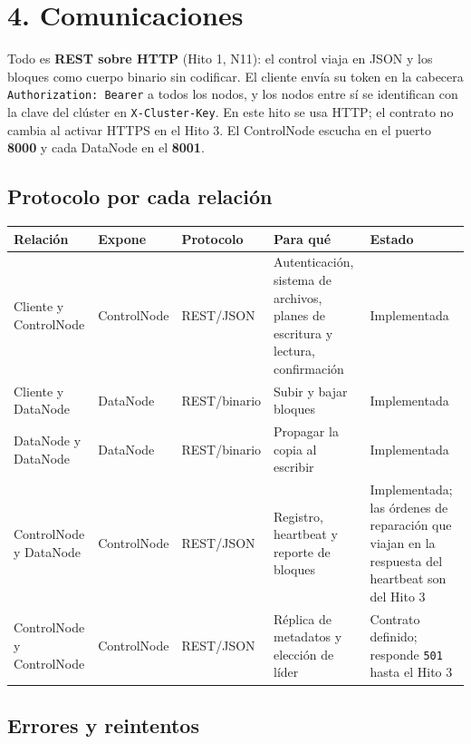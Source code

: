\documentclass[10pt]{article}
\begin{document}
\separador

\section{4. Comunicaciones}

Todo es \textbf{REST sobre HTTP} (Hito 1, N11): el control viaja en JSON y los bloques como cuerpo binario sin codificar. El cliente envía su token en la cabecera \texttt{Authorization: Bearer} a todos los nodos, y los nodos entre sí se identifican con la clave del clúster en \texttt{X-Cluster-Key}. En este hito se usa HTTP; el contrato no cambia al activar HTTPS en el Hito 3. El ControlNode escucha en el puerto \textbf{8000} y cada DataNode en el \textbf{8001}.

\subsection{Protocolo por cada relación}

\begin{xltabular}{\linewidth}{@{}L{2.5cm}L{2.0cm}L{2.2cm}YY@{}}
\toprule
Relación & Expone & Protocolo & Para qué & Estado \\
\midrule\endhead
Cliente y ControlNode & ControlNode & REST/JSON & Autenticación, sistema de archivos, planes de escritura y lectura, confirmación & Implementada \\
Cliente y DataNode & DataNode & REST/binario & Subir y bajar bloques & Implementada \\
DataNode y DataNode & DataNode & REST/binario & Propagar la copia al escribir & Implementada \\
ControlNode y DataNode & ControlNode & REST/JSON & Registro, heartbeat y reporte de bloques & Implementada; las órdenes de reparación que viajan en la respuesta del heartbeat son del Hito 3 \\
ControlNode y ControlNode & ControlNode & REST/JSON & Réplica de metadatos y elección de líder & Contrato definido; responde \texttt{501} hasta el Hito 3 \\
\bottomrule
\end{xltabular}

\subsection{Errores y reintentos}
\end{document}
